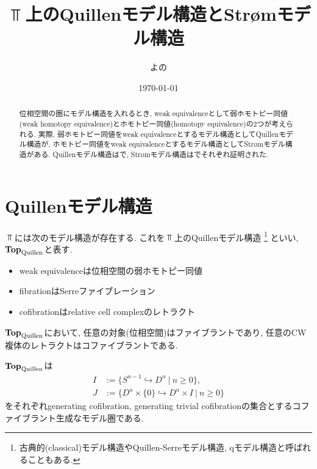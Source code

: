 \documentclass[uplatex, a4paper, 14Q, dvipdfmx]{jsarticle}
\title{$\Top$上のQuillenモデル構造とStr{\o}mモデル構造}
\author{よの}
\date{\today}
\begin{document}
\maketitle

\begin{abstract}
  位相空間の圏にモデル構造を入れるとき, weak equivalenceとして弱ホモトピー同値(weak homotopy equivalence)とホモトピー同値(homotopy equivalence)の2つが考えられる.
  実際, 弱ホモトピー同値をweak equivalenceとするモデル構造としてQuillenモデル構造が, ホモトピー同値をweak equivalenceとするモデル構造としてStr{\o}mモデル構造がある. 
  Quillenモデル構造は\cite{Qui67}で, Str{\o}mモデル構造は\cite{Str72}でそれぞれ証明された. 
\end{abstract}

\tableofcontents

\section{Quillenモデル構造} \label{subsec:quillen_model_stru_on_Top}

\begin{definition}[Quillenモデル構造]
  $\Top$には次のモデル構造が存在する. 
  これを$\Top$上のQuillenモデル構造
  \footnote{
    古典的(classical)モデル構造やQuillen-Serreモデル構造, qモデル構造と呼ばれることもある. 
  }
  といい, $\mathbf{Top}_\mathrm{Quillen}$と表す. 
  \begin{itemize}
    \item weak equivalenceは位相空間の弱ホモトピー同値
    \item fibrationはSerreファイブレーション
    \item cofibrationはrelative cell complexのレトラクト
  \end{itemize}
\end{definition}

\begin{remark}
  $\mathbf{Top}_\mathrm{Quillen}$において, 任意の対象(位相空間)はファイブラントであり, 任意のCW複体のレトラクトはコファイブラントである. 
\end{remark}

\begin{remark}
  $\mathbf{Top}_\mathrm{Quillen}$は 
  \begin{align*}
    I &:= \{S^{n-1} \hookrightarrow D^n ~|~ n \geq 0\}, \\
    J &:= \{D^n \times \{0\} \hookrightarrow D^n \times I ~|~ n \geq 0\}
  \end{align*}
  をそれぞれgenerating cofibration, generating trivial cofibrationの集合とするコファイブラント生成なモデル圏である. 
\end{remark}
\end{document}
